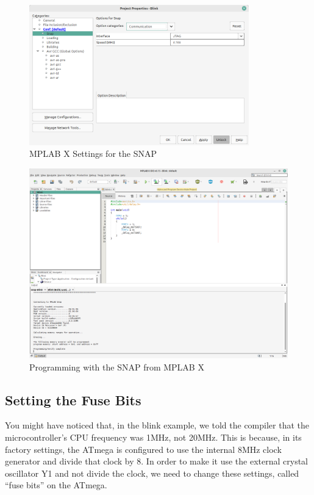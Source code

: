 \documentclass{article}
\begin{document}
\begin{figure}[htb]
\centering
\includegraphics[width=0.85\textwidth]{Pictures/SNAPMPLABX1.png}
\caption{MPLAB X Settings for the SNAP}
\label{fig:snapMplabX1}
\end{figure}

\begin{figure}[htb]
\centering
\includegraphics[width=\textwidth]{Pictures/SNAPMPLABX2.png}
\caption{Programming with the SNAP from MPLAB X}
\label{fig:snapMplabX2}
\end{figure}
\FloatBarrier

\subsection{Setting the Fuse Bits}\label{sec:fuses}
You might have noticed that, in the blink example, we told the compiler that the microcontroller's CPU frequency was 1MHz, not 20MHz. This is because, in its factory settings, the ATmega is configured to use the internal 8MHz clock generator and divide that clock by 8. In order to make it use the external crystal oscillator Y1 and not divide the clock, we need to change these settings, called ``fuse bits'' on the ATmega. 
\end{document}
